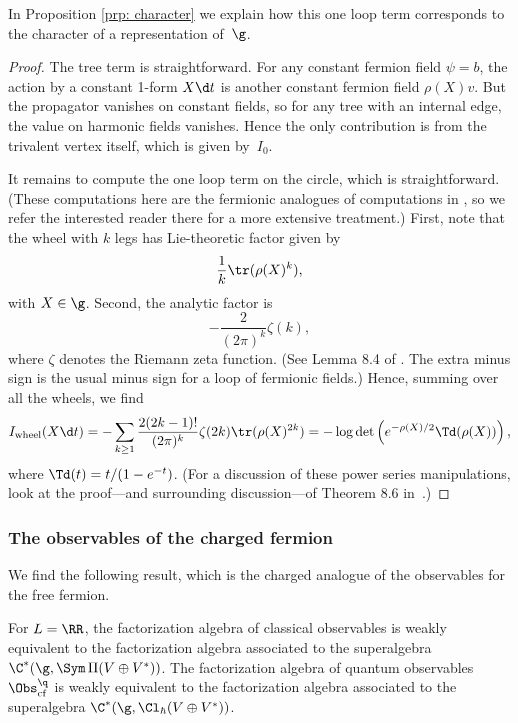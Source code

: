 \documentclass[10pt]{amsart}
\begin{document}
In Proposition \ref{prp: character} we explain how this one loop term corresponds to the character of a representation of~$\g$.

\begin{proof}
The tree term is straightforward.
For any constant fermion field $\psi =b$, the action by a constant 1-form $X \d t$ is another constant fermion field $\rho(X) v$.
But the propagator vanishes on constant fields,
so for any tree with an internal edge, the value on harmonic fields vanishes.
Hence the only contribution is from the trivalent vertex itself,
which is given by~$I_0$.

It remains to compute the one loop term on the circle,
which is straightforward.
(These computations here are the fermionic analogues of computations in \cite{GG},
so we refer the interested reader there for a more extensive treatment.)
First, note that the wheel with $k$ legs has Lie-theoretic factor given by
\[
\frac{1}{k} \tr(\rho(X)^k),
\]
with $X \in \g$.
Second, the analytic factor is 
\[
-\frac{2}{(2\pi)^k} \zeta(k),
\]
where $\zeta$ denotes the Riemann zeta function.
(See Lemma 8.4 of \cite{GG}.
The extra minus sign is the usual minus sign for a loop of fermionic fields.)
Hence, summing over all the wheels, we find
\[
I_{\rm wheel}(X \d t) = -\sum_{k\geq1} \frac{2(2k-1)!}{(2\pi)^k}\zeta(2k)\tr(\rho(X)^{2k}) 
= -\log\det\left(e^{-\rho(X)/2} \Td(\rho(X))\right),
\]
where $\Td(t) = t/(1-e^{-t})$.
(For a discussion of these power series manipulations, 
look at the proof---and surrounding discussion---of Theorem 8.6 in~\cite{GG}.)
\end{proof}

\subsubsection{The observables of the charged fermion}

We find the following result, which is the charged analogue of the observables for the free fermion.

\begin{lmm}
\label{lmm: g-eq clifford alg}
For $L = \RR$, the factorization algebra of classical observables is weakly equivalent to the factorization algebra associated to the superalgebra $\C^*(\g,\Sym\, \Pi (V \oplus V^*))$.
The factorization algebra of quantum observables $\Obs^\q_{\rm cf}$ is weakly equivalent to the factorization algebra associated to the superalgebra $\C^*(\g,\Cl_\hbar(V \oplus V^*))$.
\end{lmm}
\end{document}
